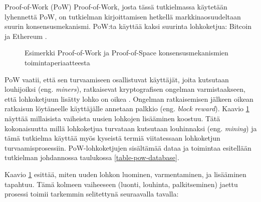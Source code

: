 \begin{section}{Proof-of-Work (PoW)\label{pow}}
Proof-of-Work, josta tässä tutkielmassa käytetään lyhennettä PoW, on tutkielman kirjoittamisen hetkellä markkinaosuudeltaan suurin konsensusmekanismi. PoW:ta käyttää kaksi suurinta lohkoketjua: Bitcoin ja Ethereum \cite{Coingecko}.

\begin{figure}[!htbp]
\centering
{}
\caption{Esimerkki Proof-of-Work ja Proof-of-Space konsensusmekanismien toimintaperiaatteesta}
\label{fig_pow}
\end{figure}

\vspace{1mm}

PoW vaatii, että sen turvaamiseen osallistuvat käyttäjät, joita kutsutaan louhijoiksi (eng. \textit{miners}), ratkaisevat kryptografisen ongelman varmistaakseen, että lohkoketjuun lisätty lohko on oikea \cite{blockchain1}. Ongelman ratkaisemisen jälkeen oikean ratkaisun löytäneelle käyttäjälle annetaan palkkio (eng. \textit{block reward}). Kaavio \ref{fig_pow} näyttää millaisista vaiheista uusien lohkojen lisääminen koostuu. Tätä kokonaisuutta millä lohkoketjua turvataan kutsutaan louhinnaksi (eng. \textit{mining}) ja tämä tutkielma käyttää myös kyseistä termiä viitatessaan lohkoketjun turvaamisprosessiin. PoW-lohkoketjujen sisältämää dataa ja toimintaa esitellään tutkielman johdannossa taulukossa \ref{table-pow-database}.

Kaavio \ref{fig_pow} esittää, miten uuden lohkon luominen, varmentaminen, ja lisääminen tapahtuu. Tämä kolmeen vaiheeseen (luonti, louhinta, palkitseminen) jaettu prosessi toimii tarkemmin selitettynä seuraavalla tavalla:


\end{section}
